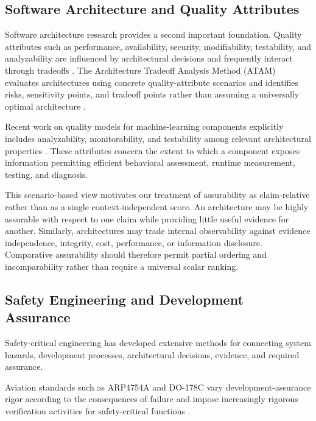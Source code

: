 \subsection{Software Architecture and Quality Attributes}

Software architecture research provides a second important foundation.
Quality attributes such as performance, availability, security, modifiability, testability, and analyzability
are influenced by architectural decisions and frequently interact through tradeoffs \cite{bass2021softwarearchitecture}.
The Architecture Tradeoff Analysis Method (ATAM) evaluates architectures using concrete
quality-attribute scenarios and identifies risks, sensitivity points, and tradeoff points rather than assuming a
universally optimal architecture \cite{clements2002evaluating, kazman2000atam}.

Recent work on quality models for machine-learning components explicitly includes analyzability, monitorability,
and testability among relevant architectural properties \cite{lewis2026mlqualitymodel}.
These attributes concern the extent to which a component exposes information permitting efficient behavioral assessment, runtime measurement, testing, and diagnosis.

This scenario-based view motivates our treatment of assurability as claim-relative rather than as a single context-independent score.
An architecture may be highly assurable with respect to one claim while providing little useful evidence for another.
Similarly, architectures may trade internal observability against evidence independence, integrity, cost, performance, or information disclosure.
Comparative assurability should therefore permit partial ordering and incomparability rather than require a universal scalar ranking.

\subsection{Safety Engineering and Development Assurance}

Safety-critical engineering has developed extensive methods for connecting system hazards, development processes, architectural decisions, evidence, and required assurance.

Aviation standards such as ARP4754A and DO-178C vary development-assurance rigor according to the consequences of failure and impose increasingly rigorous verification activities for safety-critical functions \cite{saeARP4754A,rtcaDO178C}.

